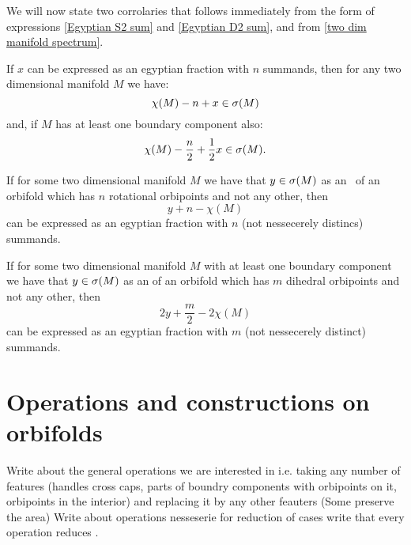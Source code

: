 We will now state two corrolaries that follows immediately from the 
form of expressions \ref{Egyptian S2 sum} and \ref{Egyptian D2 sum}, and from 
\ref{two dim manifold spectrum}.
\begin{corollary}\label{from Egyptian fractions}
If $x$ can be expressed as an egyptian fraction with $n$ summands, then for any two dimensional 
manifold $M$ we have: 
\begin{equation}
\chi(M) - n + x \in {{\sigma}(M)}
\end{equation}
and, if $M$ has at least one boundary component also:
\begin{equation}
\chi(M) - \frac{n}{2} + \frac{1}{2}x \in {{\sigma}(M)}.
\end{equation}
\end{corollary}
\begin{corollary}\label{to egyptian fractions}
If for some two dimensional manifold $M$ we have that $y \in {{\sigma}(M)}$ as an \Eoc\ of 
an orbifold which has $n$ rotational orbipoints and not any other, 
then 
\begin{equation}
y + n - \chi(M)
\end{equation} 
can be expressed as an egyptian fraction with $n$ 
(not nessecerely distincs) summands. 

If for some two dimensional manifold $M$ with at least one boundary component 
we have that $y \in {{\sigma}(M)}$ as an \Eoc of an orbifold which has $m$ dihedral orbipoints and 
not any other, 
then 
\begin{equation}
2y + \frac{m}{2} - 2\chi(M)
\end{equation}
can be expressed as an egyptian fraction with $m$ 
(not nessecerely distinct) summands. 
\end{corollary}

\section{Operations and constructions on orbifolds}\label{Operations}

Write about the general operations we are interested in i.e. taking any number of features (handles 
cross caps, parts of boundry components with orbipoints on it, orbipoints in the interior) and
replacing it by any other feauters
(Some preserve the area)
Write about operations nesseserie for reduction of cases
write that every operation reduces \Eoc.


